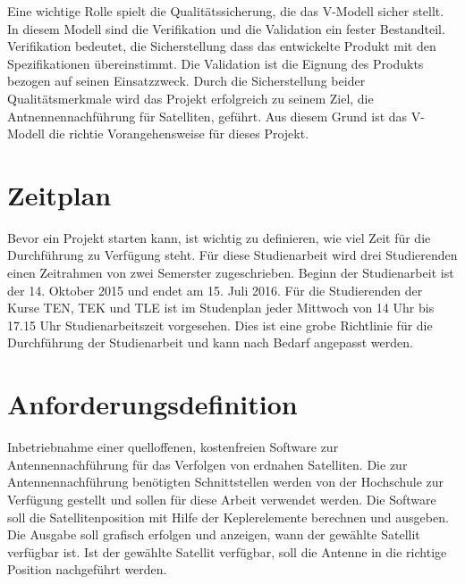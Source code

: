 Eine wichtige Rolle spielt die Qualitätssicherung, die das V-Modell sicher stellt. In diesem Modell sind die Verifikation und die Validation ein 
fester Bestandteil. Verifikation bedeutet, die Sicherstellung dass das entwickelte Produkt mit den Spezifikationen übereinstimmt.
Die Validation ist die Eignung des Produkts bezogen auf seinen Einsatzzweck. Durch die Sicherstellung beider Qualitätsmerkmale wird das Projekt 
erfolgreich zu seinem Ziel, die Antnennennachführung für Satelliten, geführt. Aus diesem Grund ist das V-Modell die richtie Vorangehensweise für 
dieses Projekt.
\newpar

\section{Zeitplan}
Bevor ein Projekt starten kann, ist wichtig  zu definieren, wie viel Zeit für die Durchführung zu Verfügung steht. Für diese Studienarbeit 
wird drei Studierenden einen Zeitrahmen von zwei Semerster zugeschrieben. Beginn der Studienarbeit ist der 14. Oktober 2015 und endet am 15. Juli 
2016. Für die Studierenden der Kurse TEN, TEK und TLE ist im Studenplan jeder Mittwoch von 14 Uhr bis 17.15 Uhr Studienarbeitszeit vorgesehen. Dies 
ist eine grobe Richtlinie für die Durchführung der Studienarbeit und kann nach Bedarf angepasst werden.
\newpar

\section{Anforderungsdefinition}
Inbetriebnahme einer quelloffenen, kostenfreien Software zur Antennennachführung für das Verfolgen von erdnahen Satelliten. Die zur 
Antennennachführung
benötigten Schnittstellen werden von der Hochschule zur Verfügung gestellt und sollen für diese Arbeit verwendet werden. Die Software soll die 
Satellitenposition mit Hilfe der Keplerelemente berechnen und ausgeben. Die Ausgabe soll grafisch erfolgen und anzeigen, wann
der gewählte Satellit verfügbar ist. Ist der gewählte Satellit verfügbar, soll die Antenne in die richtige Position nachgeführt werden. 
\newpar


